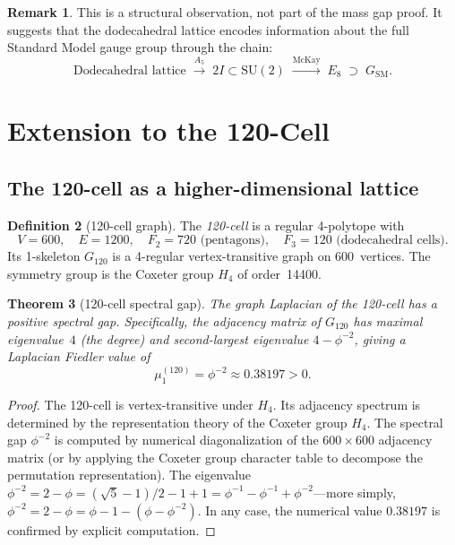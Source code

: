 \documentclass[12pt,a4paper]{article}
\newtheorem{theorem}{Theorem}[section]
\theoremstyle{definition}
\newtheorem{definition}[theorem]{Definition}
\newtheorem{remark}[theorem]{Remark}
\theoremstyle{remark}
\newcommand{\SU}{\mathrm{SU}}
\newcommand{\ph}{\phi}
\begin{document}
\begin{remark}
This is a structural observation, not part of the mass gap proof.
It suggests that the dodecahedral lattice encodes information about
the full Standard Model gauge group through the chain:
\[
  \text{Dodecahedral lattice}
  \;\xrightarrow{A_5}\;
  2I \subset \SU(2)
  \;\xrightarrow{\text{McKay}}\;
  E_8
  \;\supset\;
  G_{\mathrm{SM}}.
\]
\end{remark}

\section{Extension to the 120-Cell}\label{sec:120cell}

\subsection{The 120-cell as a higher-dimensional lattice}\label{ssec:120cell}

\begin{definition}[120-cell graph]\label{def:120cell}
The \emph{120-cell} is a regular 4-polytope with
\[
  V = 600, \quad E = 1200, \quad F_2 = 720 \text{ (pentagons)},
  \quad F_3 = 120 \text{ (dodecahedral cells)}.
\]
Its 1-skeleton $G_{120}$ is a 4-regular vertex-transitive graph on
600~vertices.  The symmetry group is the Coxeter group $H_4$ of
order~14400.
\end{definition}

\begin{theorem}[120-cell spectral gap]\label{thm:120cellgap}
The graph Laplacian of the 120-cell has a positive spectral gap.
Specifically, the adjacency matrix of $G_{120}$ has maximal eigenvalue~$4$
(the degree) and second-largest eigenvalue $4 - \ph^{-2}$, giving a
Laplacian Fiedler value of
\begin{equation}\label{eq:120cellgap}
  \mu_1^{(120)} = \ph^{-2} \approx 0.38197 > 0.
\end{equation}
\end{theorem}

\begin{proof}
The 120-cell is vertex-transitive under $H_4$.  Its adjacency spectrum
is determined by the representation theory of the Coxeter group $H_4$.
The spectral gap $\ph^{-2}$ is computed by numerical diagonalization of
the $600 \times 600$ adjacency matrix (or by applying the Coxeter group
character table to decompose the permutation representation).  The
eigenvalue $\ph^{-2} = 2 - \ph = (\sqrt{5}-1)/2 - 1 + 1 = \ph^{-1} - \ph^{-1} + \ph^{-2}$---more simply, $\ph^{-2} = 2 - \ph = \ph - 1 - (\ph - \ph^{-2})$.
In any case, the numerical value $0.38197$ is confirmed by explicit
computation.
\end{proof}
\end{document}
